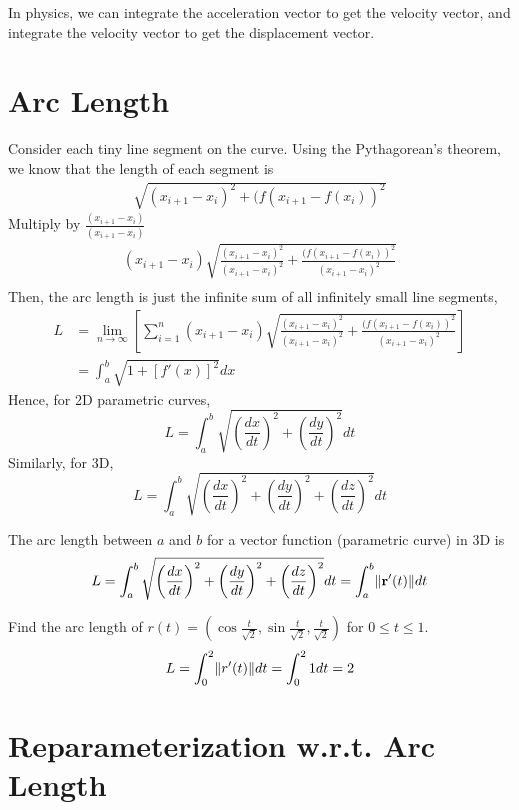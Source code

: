 In physics, we can integrate the acceleration vector to get the velocity vector, and integrate the velocity vector to get the displacement vector.

\section{Arc Length}

Consider each tiny line segment on the curve. Using the Pythagorean's theorem, we know that the length of each segment is
\begin{align*}
    \sqrt{(x_{i+1}-x_i)^2 + (f(x_{i+1}-f(x_i))^2}
\end{align*}
Multiply by $\frac{(x_{i+1}-x_i)}{(x_{i+1}-x_i)}$
\begin{align*}
    (x_{i+1}-x_i) \sqrt{\frac{(x_{i+1}-x_i)^2}{(x_{i+1}-x_i)^2} + \frac{(f(x_{i+1}-f(x_i))^2}{(x_{i+1}-x_i)^2}} \\
\end{align*}
Then, the arc length is just the infinite sum of all infinitely small line segments,
\begin{align*}
    L &=\lim_{n\to\infty} \left[\sum_{i=1}^n (x_{i+1}-x_i) \sqrt{\frac{(x_{i+1}-x_i)^2}{(x_{i+1}-x_i)^2} + \frac{(f(x_{i+1}-f(x_i))^2}{(x_{i+1}-x_i)^2}} \right] \\
    &= \int_a^b \sqrt{1+[f'(x)]^2} dx
\end{align*}
Hence, for 2D parametric curves,
$$
L = \int_a^b \sqrt{\left( \frac{dx}{dt} \right)^2 + \left( \frac{dy}{dt} \right)^2} dt
$$
Similarly, for 3D,
$$
L = \int_a^b \sqrt{\left( \frac{dx}{dt} \right)^2 + \left( \frac{dy}{dt} \right)^2 + \left( \frac{dz}{dt} \right)^2} dt
$$

\begin{theorem}
The arc length between $a$ and $b$ for a vector function (parametric curve) in 3D is
$$
L = \int_a^b \sqrt{\left( \frac{dx}{dt} \right)^2 + \left( \frac{dy}{dt} \right)^2 + \left( \frac{dz}{dt} \right)^2} dt = \int_a^b \lVert \mathbf{r}'(t) \rVert dt
$$
\end{theorem}

\begin{example}
Find the arc length of $r(t) = (\cos\frac{t}{\sqrt 2}, \sin\frac{t}{\sqrt 2}, \frac{t}{\sqrt 2})$ for $0 \leq t \leq 1$.
$$
L = \int_0^2 \lVert r'(t) \rVert dt = \int_0^2 1 dt = 2
$$
\end{example}

\section{Reparameterization w.r.t. Arc Length}

